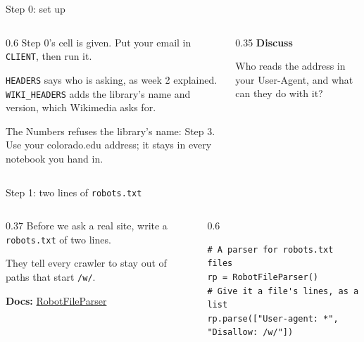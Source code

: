 \documentclass[9pt,aspectratio=169]{beamer}
\begin{document}
\begin{frame}{Step 0: set up}
    \begin{columns}[T]
        \begin{column}{0.6\textwidth}
            Step 0's cell is given. Put your email in \texttt{CLIENT}, then run it.

            \medskip
            \texttt{HEADERS} says who is asking, as week 2 explained. \texttt{WIKI\_HEADERS} adds the library's name and version, which Wikimedia asks for.

            \medskip
            The Numbers refuses the library's name: Step 3. Use your colorado.edu address; it stays in every notebook you hand in.
        \end{column}
        \begin{column}{0.35\textwidth}
            \textbf{Discuss}\\[2pt]
            {\footnotesize Who reads the address in your User-Agent, and what can they do with it?\par}
        \end{column}
    \end{columns}
\end{frame}

\begin{frame}[fragile]{Step 1: two lines of \texttt{robots.txt}}
    \begin{columns}[T]
        \begin{column}{0.37\textwidth}
            Before we ask a real site, write a \texttt{robots.txt} of two lines.

            \medskip
            They tell every crawler to stay out of paths that start \texttt{/w/}.

            \medskip
            {\scriptsize\textbf{Docs:} \href{https://docs.python.org/3/library/urllib.robotparser.html\#urllib.robotparser.RobotFileParser}{RobotFileParser}\par}
        \end{column}
        \begin{column}{0.6\textwidth}
\begin{lstlisting}
# A parser for robots.txt files
rp = RobotFileParser()
# Give it a file's lines, as a list
rp.parse(["User-agent: *", "Disallow: /w/"])
\end{lstlisting}
        \end{column}
    \end{columns}
\end{frame}
\end{document}
